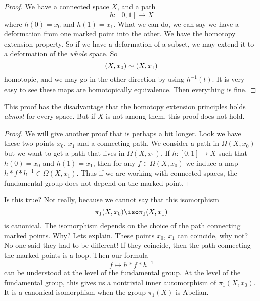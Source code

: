 \begin{proof}
We have a connected space $X$, and a path
\begin{equation}
h\colon[0,1]\to X
\end{equation}
where $h(0)=x_0$ and $h(1)=x_1$. What we can do, we can say we
have a deformation from one marked point into the other. We have
the homotopy extension property.
So if we have a deformation of a subset, we may extend it to a
deformation of the \emph{whole} space. So 
\begin{equation}
(X,x_0)\sim(X,x_1)
\end{equation}
homotopic, and we may go in the other direction by using
$h^{-1}(t)$. It is very easy to see these maps are homotopically
equivalence. Then everything is fine. 
\end{proof}
This proof has the disadvantage that the homotopy extension
principles holds \emph{almost} for every space. But if $X$ is not
among them, this proof does not hold. 
\begin{proof}
We will give another proof that is perhaps a bit longer. Look we
have these two points $x_0$, $x_1$ and a connecting path. We
consider a path in $\Omega(X,x_0)$ but we want to get a path that
lives in $\Omega(X,x_1)$. If $h\colon[0,1]\to X$ such that
$h(0)=x_0$ and $h(1)=x_1$, then for any $f\in\Omega(X,x_0)$ we
induce a map $h*f*h^{-1}\in\Omega(X,x_1)$. Thus if we are working
with connected spaces, the fundamental group does not depend on
the marked point.
\end{proof}
\begin{rmk}
Is this true? Not really, because we cannot say that this
isomorphism
\begin{equation}
\pi_{1}(X,x_0)\iso\pi_{1}(X,x_1)
\end{equation}
is canonical. The isomorphism depends on the choice of the path
connecting marked points. Why? Lets explain. These points $x_0$,
$x_1$ can coincide, why not? No one said they had to be
different! If they coincide, then the path connecting the marked
points is a loop. Then our formula
\begin{equation}
f\mapsto h*f*h^{-1}
\end{equation}
can be understood at the level of the fundamental group. At the
level of the fundamental group, this gives us a nontrivial inner
automorphism of $\pi_{1}(X,x_0)$. It is a canonical isomorphism
when the group $\pi_{1}(X)$ is Abelian.
\end{rmk}

